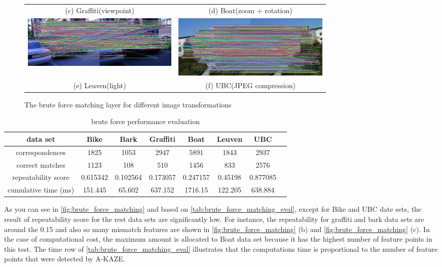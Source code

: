 \begin{figure}[H]
\begin{tabular}{cc}
(c) Graffiti(viewpoint) & (d) Boat(zoom + rotation) \\[6pt]
 \includegraphics[width=75mm]{figures/leuven_brute_1_3} &  \includegraphics[width=75mm]{figures/ubc_brute_1_3} \\
(e) Leuven(light) & (f) UBC(JPEG compression) \\[6pt]
\end{tabular}
\caption{The brute force matching layer for different image transformations}\label{fig:brute_force_matching}
\end{figure}

\begin{table}[H]
  \begin{tabular}{| c || c | c | c | c | c | c | c |}
      \hline
      data set & Bike & Bark & Graffiti & Boat & Leuven & UBC \\ \hline \hline
      correspondences & 1825 & 1053 & 2947 & 5891 & 1843 & 2937 \\ \hline
      correct matches & 1123 & 108 & 510 & 1456 & 833 & 2576 \\ \hline
      repeatability score & 0.615342 & 0.102564 & 0.173057 & 0.247157 & 0.45198 & 0.877085\\ \hline
      cumulative time (ms) & 151.445 & 65.602 & 637.152 & 1716.15 & 122.205 & 638.884 \\ \hline
  \end{tabular}
  \caption{brute force performance evaluation} \label{tab:brute_force_matching_eval}
\end{table}

As you can see in \autoref{fig:brute_force_matching} and based on \autoref{tab:brute_force_matching_eval}, except for Bike and UBC date sets, the result of repeatability score for the rest data sets are significantly low. For instance, the repeatability for graffiti and bark data sets are around the 0.15 and also so many mismatch features are shown in \autoref{fig:brute_force_matching} (b) and \autoref{fig:brute_force_matching} (c). In the case of computational cost, the maximum amount is allocated to Boat data set because it has the highest number of feature points in this test. The time row of \autoref{tab:brute_force_matching_eval} illustrates that the computations time is proportional to the number of feature points that were detected by A-KAZE.

